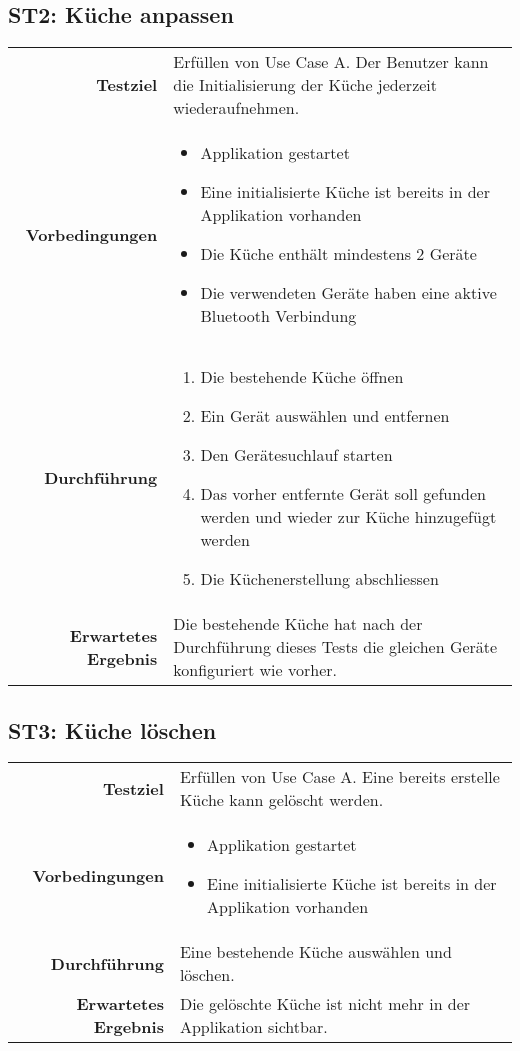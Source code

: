 \subsection{ST2: Küche anpassen}
\begin{table}[H]
\begin{tabularx}{\textwidth}{r X }
\textbf{Testziel} & Erfüllen von Use Case A. Der Benutzer kann die Initialisierung der Küche jederzeit wiederaufnehmen.\\
\textbf{Vorbedingungen} & \begin{itemize}
\item Applikation gestartet
\item Eine initialisierte Küche ist bereits in der Applikation vorhanden
\item Die Küche enthält mindestens 2 Geräte
\item Die verwendeten Geräte haben eine aktive Bluetooth Verbindung
\end{itemize} \\
\textbf{Durchführung} & \begin{enumerate}
\item Die bestehende Küche öffnen
\item Ein Gerät auswählen und entfernen
\item Den Gerätesuchlauf starten
\item Das vorher entfernte Gerät soll gefunden werden und wieder zur Küche hinzugefügt werden
\item Die Küchenerstellung abschliessen
\end{enumerate} \\
\textbf{Erwartetes Ergebnis} & Die bestehende Küche hat nach der Durchführung dieses Tests die gleichen Geräte konfiguriert wie vorher.\\
\end{tabularx}
\end{table}

\subsection{ST3: Küche löschen}
\begin{table}[H]
\begin{tabularx}{\textwidth}{r X }
\textbf{Testziel} & Erfüllen von Use Case A. Eine bereits erstelle Küche kann gelöscht werden.\\
\textbf{Vorbedingungen} & \begin{itemize}
\item Applikation gestartet
\item Eine initialisierte Küche ist bereits in der Applikation vorhanden
\end{itemize} \\
\textbf{Durchführung} & Eine bestehende Küche auswählen und löschen. \\
\textbf{Erwartetes Ergebnis} & Die gelöschte Küche ist nicht mehr in der Applikation sichtbar.\\
\end{tabularx}
\end{table}

